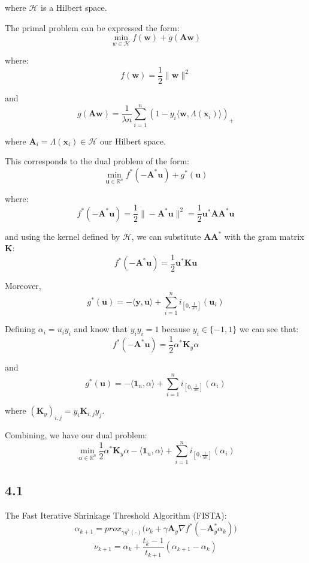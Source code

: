\documentclass[12pt]{article}
\begin{document}
where $\mathcal{H}$ is a Hilbert space.

The primal problem can be expressed the form:
\[\min_{w \in \mathcal{H}} f(\textbf{w}) + g(\textbf{A}\textbf{w})\]

where:
\[f(\textbf{w}) = \frac{1}{2}\| \textbf{w}\|^2\]

and
\[g(\textbf{A}\textbf{w}) = \frac{1}{\lambda n} \sum_{i=1}^{n} (1-y_i \langle \textbf{w}, \Lambda(\textbf{x}_i)\rangle)_{+}\]

where $\textbf{A}_i = \Lambda(\textbf{x}_i) \in \mathcal{H}$ our Hilbert space.

This corresponds to the dual problem of the form:
\[\min_{\textbf{u} \in \mathbb{R}^{n}} f^*(-\textbf{A}^*\textbf{u}) + g^*(\textbf{u})\]

where:
\[f^*(-\textbf{A}^*\textbf{u}) = \frac{1}{2}\| -\textbf{A}^*\textbf{u}\|^2 = \frac{1}{2} \textbf{u}^*\textbf{A} \textbf{A}^*\textbf{u}\]

and using the kernel defined by $\mathcal{H}$, we can substitute $\textbf{A} \textbf{A}^*$ with the gram matrix $\textbf{K}$:
\[f^*(-\textbf{A}^*\textbf{u}) = \frac{1}{2} \textbf{u}^*\textbf{K}\textbf{u}\]

Moreover,
\[g^*(\textbf{u}) = - \langle \textbf{y}, \textbf{u}\rangle + \sum_{i=1}^{n} i_{\left[0, \frac{1}{\lambda n}\right]}(\textbf{u}_i)\]

Defining $\alpha_i = u_i y_i$ and know that $y_i y_i = 1$ because $y_i \in \{-1, 1\}$ we can see that:
\[f^*(-\textbf{A}^*\textbf{u}) = \frac{1}{2} \alpha^*\textbf{K}_y\alpha\]

and
\[g^*(\textbf{u}) = - \langle \textbf{1}_n, \alpha \rangle + \sum_{i=1}^{n} i_{\left[0, \frac{1}{\lambda n}\right]}(\alpha_i)\]

where $(\textbf{K}_y)_{i, j} = y_i \textbf{K}_{i, j} y_j$.

Combining, we have our dual problem:
\[\min_{\alpha \in \mathbb{R}^n} \frac{1}{2} \alpha^*\textbf{K}_y\alpha - \langle \textbf{1}_n, \alpha \rangle + \sum_{i=1}^{n} i_{\left[0, \frac{1}{\lambda n}\right]}(\alpha_i)\]

\newpage
\subsection*{4.1}

The Fast Iterative Shrinkage Threshold Algorithm (FISTA):
\[\alpha_{k+1} = prox_{\gamma g^*(\cdot)}\bigg(\nu_k + \gamma \textbf{A}_y \nabla f^*(-\textbf{A}_y^* \alpha_{k})\bigg)\]
\[\nu_{k+1} = \alpha_{k} + \frac{t_k - 1}{t_{k+1}}(\alpha_{k+1}-\alpha_{k})\]
\end{document}
